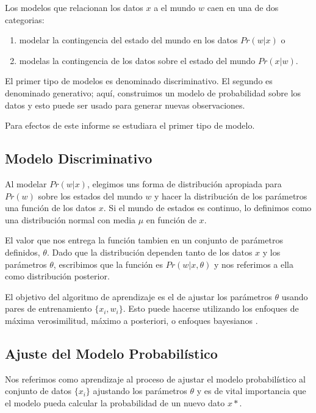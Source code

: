 \documentclass[letter,12pt]{report}
\begin{document}
Los modelos que relacionan los datos $x$ a el mundo $w$ caen en una de dos categorias:
\begin{enumerate}
    \item modelar la contingencia del estado del mundo en los datos $Pr(w|x)$ o
    \item modelas la contingencia de los datos sobre el estado del mundo $Pr(x|w)$.
\end{enumerate}

El primer tipo de modelos es denominado discriminativo. El segundo es denominado
generativo; aquí, construimos un modelo de probabilidad sobre los datos y esto puede ser
usado para generar nuevas observaciones.

Para efectos de este informe se estudiara el primer tipo de modelo.

\subsection{Modelo Discriminativo}
Al modelar $Pr(w|x)$, elegimos uns forma de distribución apropiada para $Pr(w)$ sobre los
estados del mundo $w$ y hacer la distribución de los parámetros una función de los datos
$x$. Si el mundo de estados es continuo, lo definimos como una distribución normal con
media $\mu$ en función de $x$. %

El valor que nos entrega la función tambien en un conjunto de parámetros definidos,
$\theta$. Dado que la distribución dependen tanto de los datos $x$ y los parámetros
$\theta$, escribimos que la función es $Pr(w|x, \theta)$ y nos referimos a ella como
distribución posterior.

El objetivo del algoritmo de aprendizaje es el de ajustar los parámetros $\theta$ usando
pares de entrenamiento $\{x_i, w_i\}$. Esto puede hacerse utilizando los enfoques de
máxima verosimilitud, máximo a posteriori, o enfoques bayesianos .%

\subsection{Ajuste del Modelo Probabilístico}
Nos referimos como aprendizaje al proceso de ajustar el modelo probabilístico al conjunto
de datos $\{x_i\}$ ajustando los parámetros $\theta$ y es de vital importancia que el
modelo pueda calcular la probabilidad de un nuevo dato $x*$.
\end{document}
